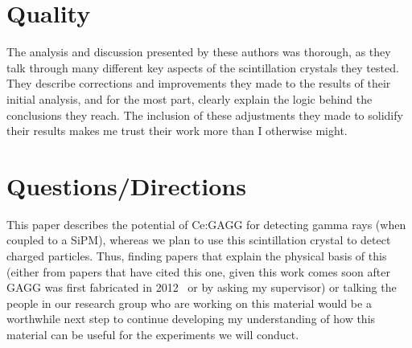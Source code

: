 \documentclass[12pt,a4paper]{article}
\begin{document}
\section*{Quality}
The analysis and discussion presented by these authors was thorough, as they talk through many different key aspects of the scintillation crystals they tested. They describe corrections and improvements they made to the results of their initial analysis, and for the most part, clearly explain the logic behind the conclusions they reach. The inclusion of these adjustments they made to solidify their results makes me trust their work more than I otherwise might.

\section*{Questions/Directions}
This paper describes the potential of Ce:GAGG for detecting gamma rays (when coupled to a SiPM), whereas we plan to use this scintillation crystal to detect charged particles. Thus, finding papers that explain the physical basis of this (either from papers that have cited this one, given this work comes soon after GAGG was first fabricated in 2012~\cite{kamada_2inch_2012} or by asking my supervisor) or talking the people in our research group who are working on this material would be a worthwhile next step to continue developing my understanding of how this material can be useful for the experiments we will conduct.

\vspace*{-\baselineskip}

{}
\end{document}
